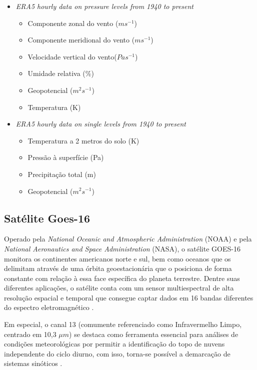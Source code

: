 	\begin{itemize}
		\item \textit{ERA5 hourly data on pressure levels from 1940 to present}
		\begin{itemize}
			\item Componente zonal do vento ($ms^{-1}$)
			\item Componente meridional do vento ($ms^{-1}$)
			\item Velocidade vertical do vento($Pas^{-1}$)
			\item Umidade relativa (\%)
			\item Geopotencial ($m^{2}s^{-1}$)
			\item Temperatura (K)
		\end{itemize}
		\item \textit{ERA5 hourly data on single levels from 1940 to present}
		\begin{itemize}
			\item Temperatura a 2 metros do solo (K)
			\item Pressão à superfície (Pa)
			\item Precipitação total (m)
			\item Geopotencial ($m^{2}s^{-1}$)
		\end{itemize}
	\end{itemize}
	
\subsection{Satélite Goes-16}
	Operado pela \textit{National Oceanic and Atmospheric Administration} (NOAA) e pela \textit{National Aeronautics and Space Administration} (NASA), o satélite GOES-16 monitora os continentes americanos norte e sul, bem como oceanos que os delimitam através de uma órbita geoestacionária que o posiciona de forma constante com relação à essa face específica do planeta terrestre. Dentre suas diferentes aplicações, o satélite conta com um sensor multiespectral de alta resolução espacial e temporal que consegue captar dados em 16 bandas diferentes do espectro eletromagnético \autocite{goodman2019goes}. 
	
	 
	Em especial, o canal 13 (comumente referenciado como Infravermelho Limpo, centrado em 10,3 $\mu m$) se destaca como ferramenta essencial para análises de condições meteorológicas por permitir a identificação do topo de nuvens independente do ciclo diurno, com isso, torna-se possível a demarcação de sistemas sinóticos \autocite{schmit2017closer}.
	
